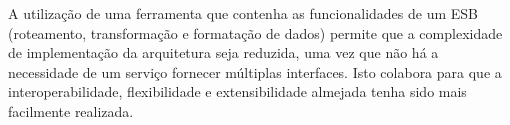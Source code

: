 A utilização de uma ferramenta que contenha as funcionalidades de um ESB (roteamento, transformação e formatação de dados) permite que a complexidade de implementação da arquitetura seja reduzida, uma vez que não há a necessidade de um serviço fornecer múltiplas interfaces. Isto colabora para que a interoperabilidade, flexibilidade e extensibilidade almejada tenha sido mais facilmente realizada.
